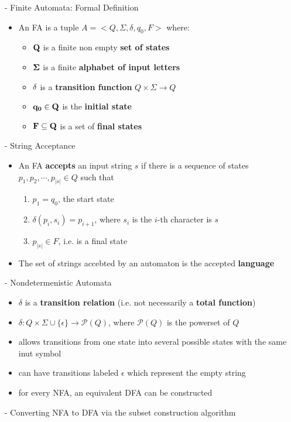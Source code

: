 \documentclass[11pt]{article}
\begin{document}
- Finite Automata: Formal Definition
\begin{itemize}
 \item An FA is a tuple $A=<Q, \Sigma , \delta , q_0 , F>$ where:
  \begin{itemize}
   \item ${\bf Q}$ is a finite non empty {\bf set of states}
   \item ${\bf \Sigma}$ is a finite {\bf alphabet of input letters}
   \item ${\bf \delta}$ is a {\bf transition function} $Q \times \Sigma \rightarrow Q $
   \item ${\bf q_0 \in Q}$ is the {\bf initial state}
   \item ${\bf F \subseteq Q}$ is a set of {\bf final states}
  \end{itemize}
\end{itemize}
- String Acceptance
\begin{itemize}
 \item An FA {\bf accepts} an input string $s$ if there is a sequence of states $p_1 , p_2 , \dotsi , p_{|s|} \in Q$ such that
  \begin{enumerate}
   \item $p_1 = q_0$, the start state
   \item $\delta(p_i , s_i ) = p_{i+1}$, where $s_i$ is the $i$-th character is $s$
   \item $p_{|s|} \in F$, i.e. is a final state
  \end{enumerate}
 \item The set of strings accebted by an automaton is the accepted {\bf language}
\end{itemize}
- Nondetermenistic Automata
\begin{itemize}
 \item $\delta$ is a {\bf transition relation} (i.e. not necessarily a {\bf total function})
 \item $\delta : Q \times \Sigma \cup \{ \epsilon \} \rightarrow \mathcal{P}(Q)$, where $\mathcal{P}(Q)$ is the powerset of $Q$
 \item allows transitions from one state into several possible states with the same inut symbol
 \item can have transitions labeled $\epsilon$ which represent the empty string
 \item for every NFA, an equivalent DFA can be constructed
\end{itemize}
- Converting NFA to DFA via the subset construction algorithm
\end{document}
